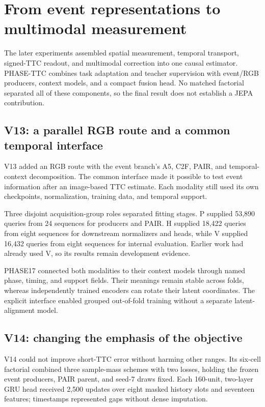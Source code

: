 \section{From event representations to multimodal measurement}
\label{sec:late}

The later experiments assembled spatial measurement, temporal transport, signed-TTC readout, and multimodal correction into one causal estimator. PHASE-TTC combines task adaptation and teacher supervision with event/RGB producers, context models, and a compact fusion head. No matched factorial separated all of these components, so the final result does not establish a JEPA contribution.

\subsection{V13: a parallel RGB route and a common temporal interface}

V13 added an RGB route with the event branch's A5, C2F, PAIR, and temporal-context decomposition. The common interface made it possible to test event information after an image-based TTC estimate. Each modality still used its own checkpoints, normalization, training data, and temporal support.

Three disjoint acquisition-group roles separated fitting stages. P supplied 53,890 queries from 24 sequences for producers and PAIR. H supplied 18,422 queries from eight sequences for downstream normalizers and heads, while V supplied 16,432 queries from eight sequences for internal evaluation. Earlier work had already used V, so its results remain development evidence.

PHASE17 connected both modalities to their context models through named phase, timing, and support fields. Their meanings remain stable across folds, whereas independently trained encoders can rotate their latent coordinates. The explicit interface enabled grouped out-of-fold training without a separate latent-alignment model.

\subsection{V14: changing the emphasis of the objective}

V14 could not improve short-TTC error without harming other ranges. Its six-cell factorial combined three sample-mass schemes with two losses, holding the frozen event producers, PAIR parent, and seed-7 draws fixed. Each 160-unit, two-layer GRU head received 2,500 updates over eight masked history slots and seventeen features; timestamps represented gaps without dense imputation.

